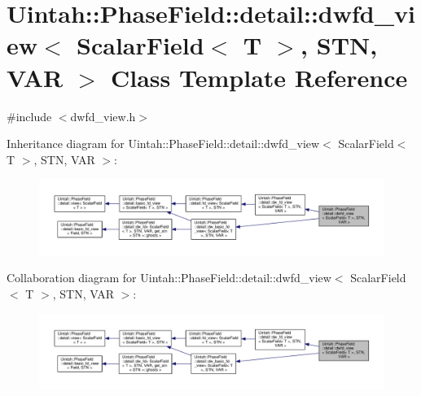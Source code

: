 \hypertarget{classUintah_1_1PhaseField_1_1detail_1_1dwfd__view_3_01ScalarField_3_01T_01_4_00_01STN_00_01VAR_01_4}{}\section{Uintah\+:\+:Phase\+Field\+:\+:detail\+:\+:dwfd\+\_\+view$<$ Scalar\+Field$<$ T $>$, S\+TN, V\+AR $>$ Class Template Reference}
\label{classUintah_1_1PhaseField_1_1detail_1_1dwfd__view_3_01ScalarField_3_01T_01_4_00_01STN_00_01VAR_01_4}


{\ttfamily \#include $<$dwfd\+\_\+view.\+h$>$}



Inheritance diagram for Uintah\+:\+:Phase\+Field\+:\+:detail\+:\+:dwfd\+\_\+view$<$ Scalar\+Field$<$ T $>$, S\+TN, V\+AR $>$\+:\nopagebreak
\begin{figure}[H]
\begin{center}
\leavevmode
\includegraphics[width=350pt]{classUintah_1_1PhaseField_1_1detail_1_1dwfd__view_3_01ScalarField_3_01T_01_4_00_01STN_00_01VAR_01_4__inherit__graph}
\end{center}
\end{figure}


Collaboration diagram for Uintah\+:\+:Phase\+Field\+:\+:detail\+:\+:dwfd\+\_\+view$<$ Scalar\+Field$<$ T $>$, S\+TN, V\+AR $>$\+:\nopagebreak
\begin{figure}[H]
\begin{center}
\leavevmode
\includegraphics[width=350pt]{classUintah_1_1PhaseField_1_1detail_1_1dwfd__view_3_01ScalarField_3_01T_01_4_00_01STN_00_01VAR_01_4__coll__graph}
\end{center}
\end{figure}

